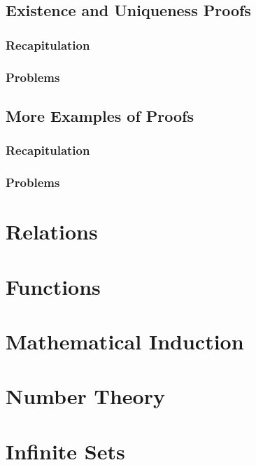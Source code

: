 \documentclass{report}
\begin{document}
    \section{Existence and Uniqueness Proofs}
        \subsection{Recapitulation}
        \subsection{Problems}
    \section{More Examples of Proofs}
        \subsection{Recapitulation}
        \subsection{Problems}

\chapter{Relations}

\chapter{Functions}

\chapter{Mathematical Induction}

\chapter{Number Theory}

\chapter{Infinite Sets}
\end{document}
